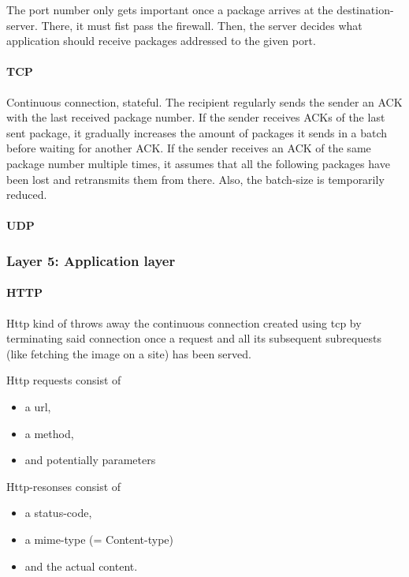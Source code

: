 The port number only gets important once a package arrives at the destination-server. 
There, it must fist pass the firewall. Then, the server decides what application should receive packages addressed to the given port. 

\paragraph{TCP} 

Continuous connection, stateful. The recipient regularly sends the sender an ACK with the last received package number. 
If the sender receives ACKs of the last sent package, it gradually increases the amount of packages it sends in a batch before waiting for another ACK. 
If the sender receives an ACK of the same package number multiple times, it assumes that all the following packages have been lost and retransmits them from there. Also, the batch-size is temporarily reduced. 

\paragraph{UDP}

\subsubsection{Layer 5: Application layer}

\paragraph{HTTP} 

Http kind of throws away the continuous connection created using tcp by terminating said connection once a request and all its subsequent subrequests (like fetching the image on a site) has been served. 

Http requests consist of 
\begin{itemize}
    \item a url, 
    \item a method, 
    \item and potentially parameters
\end{itemize} 

Http-resonses consist of 
\begin{itemize}
    \item a status-code, 
    \item a mime-type (= Content-type) 
    \item and the actual content. 
\end{itemize}
    
